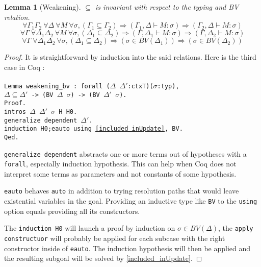 \documentclass{article}
\newtheorem{lemma}[theorem]{Lemma}
\begin{document}
    \begin{lemma}[Weakening]\label{weakening}$\subseteq$ is invariant with respect to the typing and BV relation.
    $$\forall\Gamma_1\Gamma_2\ \forall\Delta\ \forall M\ \forall\sigma, (\Gamma_1\subseteq\Gamma_2) \Rightarrow (\Gamma_1, \Delta\vdash M : \sigma) \Rightarrow (\Gamma_2, \Delta\vdash M : \sigma)$$
    $$\forall\Gamma\ \forall\Delta_1\Delta_2\ \forall M\ \forall\sigma, (\Delta_1\subseteq\Delta_2) \Rightarrow (\Gamma, \Delta_1\vdash M : \sigma) \Rightarrow (\Gamma, \Delta_2\vdash M : \sigma)$$
    $$\forall\Gamma\ \forall\Delta_1\Delta_2\ \forall\sigma, (\Delta_1\subseteq\Delta_2) \Rightarrow (\sigma\in BV(\Delta_1)) \Rightarrow (\sigma\in BV(\Delta_2))$$
    \end{lemma}
    \begin{proof}
It is straightforward by induction into the said relations. Here is the third case in Coq :\\\\
\texttt{Lemma weakening\_bv : forall ($\Delta$ $\Delta'$:ctxT)($\sigma$:typ),\\
                             $\Delta\subseteq \Delta'$ ->
                             (BV $\Delta$ $\sigma$) -> (BV $\Delta'$ $\sigma$).\\
Proof.\\
  intros $\Delta$ $\Delta'$ $\sigma$ H H0.\\
  generalize dependent $\Delta'$.\\
  induction H0;eauto using \ref{included_inUpdate}, BV.\\
Qed.\\
}\par
\texttt{generalize dependent} abstracts one or more terms out of hypotheses with a \texttt{forall}, especially induction hypothesis. This can help when Coq does not interpret some terms as parameters and not constants of some hypothesis.
\par\texttt{eauto} behaves \texttt{auto} in addition to trying resolution paths that would leave existential variables in the goal. Providing an inductive type like \texttt{BV} to the \texttt{using} option equals providing all its constructors.
\par The \texttt{induction H0} will launch a proof by induction on $\sigma\in BV(\Delta)$, the \texttt{apply constructuor} will probably be applied for each subcase with the right constructor inside of \texttt{eauto}. The induction hypothesis will then be applied and the resulting subgoal will be solved by \ref{included_inUpdate}.
    \end{proof}
\end{document}
